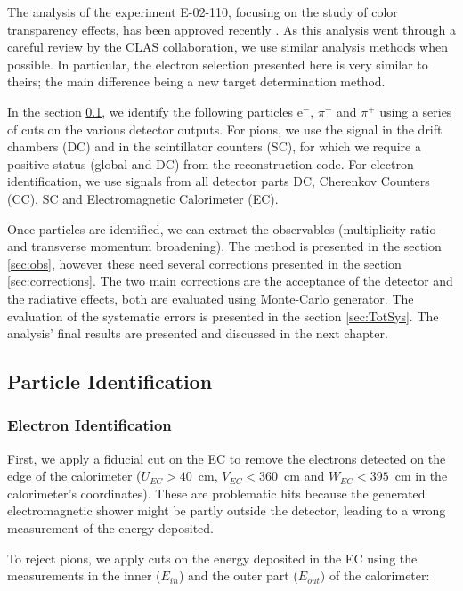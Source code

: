 The analysis of the experiment E-02-110, focusing on the study of color 
transparency effects, has been approved recently \cite{ElFassi:2008}. As this 
analysis went through a careful review by the CLAS collaboration, we use
similar analysis methods when possible. In particular, the electron selection 
presented here is very similar to theirs; the main difference being a new 
target determination method.

In the section \ref{sec:pid}, we identify the following particles e$^-$, 
$\pi^-$ and $\pi^+$ using a series of cuts on the various 
detector outputs. For pions, we use the signal in the drift chambers (DC) and 
in the scintillator counters (SC), for which we require a positive status (global and DC) 
from the reconstruction code. For electron identification, we use signals from 
all detector parts DC, Cherenkov Counters (CC), SC and Electromagnetic 
Calorimeter (EC).

Once particles are identified, we can extract the observables (multiplicity 
ratio and transverse momentum broadening). The method is presented in the 
section \ref{sec:obs}, however these need several corrections presented in the 
section \ref{sec:corrections}. The 
two main corrections are the acceptance of the detector and the radiative 
effects, both are evaluated using Monte-Carlo generator. The evaluation of 
the systematic errors is presented in the section \ref{sec:TotSys}.
The analysis' final results are presented and discussed in the next chapter.

\subsection{Particle Identification}
\label{sec:pid}

\subsubsection{Electron Identification}

First, we apply a fiducial cut on the EC to remove the electrons detected on 
the edge of the calorimeter ($U_{EC}>40$~cm, $V_{EC}<360$~cm and 
$W_{EC}<395$~cm in the calorimeter's coordinates). These are problematic hits 
because the generated electromagnetic shower might be partly outside the 
detector, leading to a wrong measurement of the energy deposited.

To reject pions, we apply cuts on the energy deposited
in the EC using the measurements in the inner ($E_{in}$) and the 
outer part ($E_{out})$ of the calorimeter:

